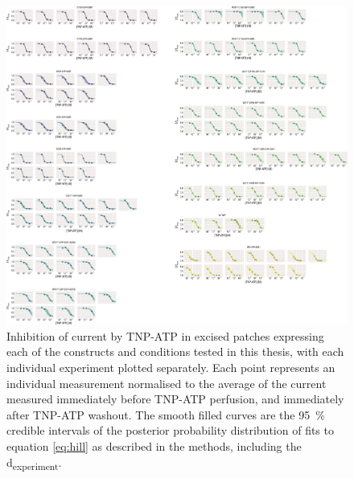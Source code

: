 \begin{figure}[h]
	\centering
	\includegraphics[width=\textwidth]{all_tnpatp_fits_2.pdf}
	\caption[TNP-ATP inhibition sample hill fits]{
	Inhibition of current by TNP-ATP in excised patches expressing each of the constructs and conditions tested in this thesis, with each individual experiment plotted separately.
	Each point represents an individual measurement normalised to the average of the current measured immediately before TNP-ATP perfusion, and immediately after TNP-ATP washout.
	The smooth filled curves are the \SI{95}{\percent} credible intervals of the posterior probability distribution of fits to equation \ref{eq:hill} as described in the methods, including the \textgreek{d}\textsubscript{experiment}.
	}
	\label{apxfig:tnpatp_inhib_2}
\end{figure}

